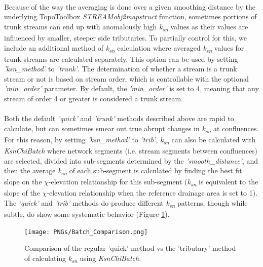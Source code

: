\paragraph{}Because of the way the averaging is done over a given smoothing distance by the underlying TopoToolbox \textit{STREAMobj2mapstruct} function, sometimes portions of trunk streams can end up with anomalously high \textit{k\textsubscript{sn}} values as their values are influenced by smaller, steeper side tributaries. To partially control for this, we include an additional method of \textit{k\textsubscript{sn}} calculation where averaged \textit{k\textsubscript{sn}} values for trunk streams are calculated separately. This option can be used by setting \textit{'ksn\_method'} to \textit{'trunk'}. The determination of whether a stream is a trunk stream or not is based on stream order, which is controllable with the optional \textit{'min\_order'} parameter. By default, the \textit{'min\_order'} is set to 4, meaning that any stream of order 4 or greater is considered a trunk stream.

\paragraph{}Both the default \textit{'quick'} and \textit{'trunk'} methods described above are rapid to calculate, but can sometimes smear out true abrupt changes in \textit{k\textsubscript{sn}} at confluences. For this reason, by setting \textit{'ksn\_method'} to \textit{'trib'}, \textit{k\textsubscript{sn}} can also be calculated with \textit{KsnChiBatch} where network segments (i.e. stream segments between confluences) are selected, divided into sub-segments determined by the \textit{'smooth\_distance'}, and then the average \textit{k\textsubscript{sn}} of each sub-segment is calculated by finding the best fit slope on the $\chi$-elevation relationship for this sub-segment (\textit{k\textsubscript{sn}} is equivalent to the slope of the $\chi$-elevation relationship when the reference drainage area is set to 1). The \textit{'quick'} and \textit{'trib'} methods do produce different \textit{k\textsubscript{sn}} patterns, though while subtle, do show some systematic behavior (Figure \ref{fig:BatchComp}).

\begin{figure}[H]
	\texttt{[image: PNGs/Batch\_Comparison.png]}
	\caption{Comparison of the regular 'quick' method vs the 'tributary' method of calculating \textit{k\textsubscript{sn}} using \textit{KsnChiBatch}.}
	\label{fig:BatchComp}
\end{figure}

